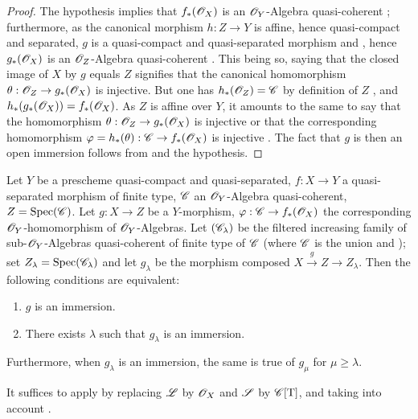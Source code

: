 \begin{proof}
The hypothesis implies that $f_*(\mathscr{O}_X)$ is an $\mathscr{O}_Y$-Algebra quasi-coherent ; furthermore, as the canonical morphism $h:Z\to Y$ is affine, hence quasi-compact and separated, $g$ is a quasi-compact and quasi-separated morphism  and , hence $g_*(\mathscr{O}_X)$ is an $\mathscr{O}_Z$-Algebra quasi-coherent .
This being so, saying that the closed image of $X$ by $g$ equals $Z$ signifies  that the canonical homomorphism $\theta:\mathscr{O}_Z\to g_*(\mathscr{O}_X)$ is injective.
But one has $h_*(\mathscr{O}_Z)=\mathscr{C}$ by definition of $Z$ , and $h_*(g_*(\mathscr{O}_X))=f_*(\mathscr{O}_X)$.
As $Z$ is affine over $Y$, it amounts to the same to say that the homomorphism $\theta:\mathscr{O}_Z\to g_*(\mathscr{O}_X)$ is injective or that the corresponding homomorphism $\varphi=h_*(\theta):\mathscr{C}\to f_*(\mathscr{O}_X)$ is injective .
The fact that $g$ is then an open immersion follows from  and the hypothesis.
\end{proof}

\begin{lemma}[8.12.2]
\label{IV.8.12.2}
Let $Y$ be a prescheme quasi-compact and quasi-separated, $f:X\to Y$ a quasi-separated morphism of finite type, $\mathscr{C}$ an $\mathscr{O}_Y$-Algebra quasi-coherent, $Z=\operatorname{Spec}(\mathscr{C})$.
Let $g:X\to Z$ be a $Y$-morphism, $\varphi:\mathscr{C}\to f_*(\mathscr{O}_X)$ the corresponding $\mathscr{O}_Y$-homomorphism of $\mathscr{O}_Y$-Algebras.
Let $(\mathscr{C}_\lambda)$ be the filtered increasing family of sub-$\mathscr{O}_Y$-Algebras quasi-coherent of finite type of $\mathscr{C}$ (where $\mathscr{C}$ is the union  and ); set $Z_\lambda=\operatorname{Spec}(\mathscr{C}_\lambda)$ and let $g_\lambda$ be the morphism composed $X\xrightarrow{g}Z\to Z_\lambda$.
Then the following conditions are equivalent:
\begin{enumerate}[label=\emph{\alph*)}]
  \item $g$ is an immersion.
  \item There exists $\lambda$ such that $g_\lambda$ is an immersion.
\end{enumerate}
Furthermore, when $g_\lambda$ is an immersion, the same is true of $g_\mu$ for $\mu\geqslant\lambda$.
\end{lemma}

It suffices to apply  by replacing $\mathscr{L}$ by $\mathscr{O}_X$ and $\mathscr{S}$ by $\mathscr{C}[\mathrm{T}]$, and taking into account .

